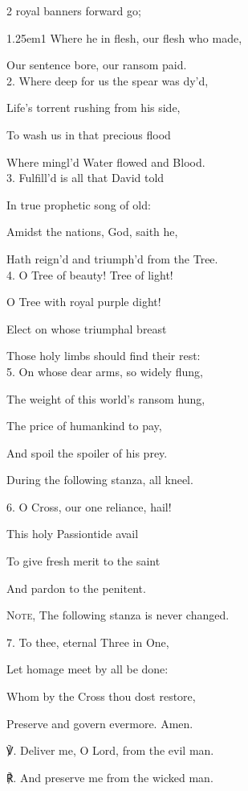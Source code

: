\begin{multicols}{2}
 royal banners forward go;

\begin{hangparas}{1.25em}{1}
Where he in flesh, our flesh who made,

Our sentence bore, our ransom paid.\\

2. Where deep for us the spear was dy'd,

Life's torrent rushing from his side,

To wash us in that precious flood

Where mingl'd Water flowed and Blood.\\

3. Fulfill'd is all that David told

In true prophetic song of old:

Amidst the nations, God, saith he,

Hath reign'd and triumph'd from the Tree.\\

4. O Tree of beauty! Tree of light!

O Tree with royal purple dight!

Elect on whose triumphal breast

Those holy limbs should find their rest:\\

5. On whose dear arms, so widely flung,

The weight of this world's ransom hung,

The price of humankind to pay,

And spoil the spoiler of his prey.

{\begin{rubric}
	During the following stanza, all kneel.
\end{rubric}}

{6. O Cross, our one reliance, hail!

This holy Passiontide avail

To give fresh merit to the saint

And pardon to the penitent.\\}

{\begin{rubric}
	\textsc{Note,} The following stanza is never changed.
\end{rubric}}

{7. To thee, eternal Three in One,

Let homage meet by all be done:

Whom by the Cross thou dost restore,

Preserve and govern evermore. Amen.\\}
\end{hangparas}

℣. Deliver me, O Lord, from the evil man.

℟. And preserve me from the wicked man.

\\
\end{multicols}

